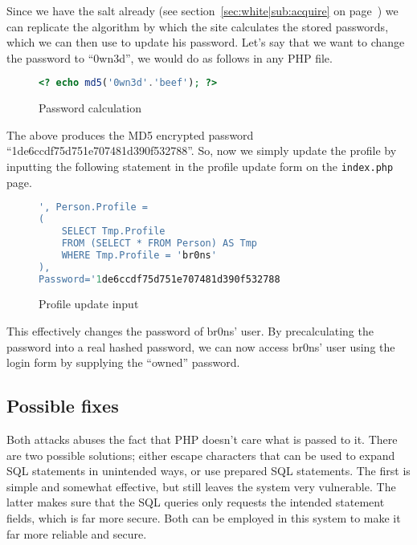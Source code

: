 \documentclass[11pt,a4paper]{article}
\newcommand{\file}[1]{{\tt #1}}
\newcommand{\secref}[1]{(see section~\ref{#1} on page~\pageref{#1})}
\begin{document}
\begin{multicols}{2}
Since we have the salt already \secref{sec:white|sub:acquire} we can replicate
the algorithm by which the site calculates the stored passwords, which we can
then use to update his password. Let's say that we want to change the password
to ``0wn3d'', we would do as follows in any PHP file.

\begin{figure}[H]
    \begin{lstlisting}[language=PHP]
<? echo md5('0wn3d'.'beef'); ?>
    \end{lstlisting}
    \caption{Password calculation}
\end{figure}

The above produces the MD5 encrypted password
``1de6ccdf75d751e707481d390f532788''. So, now we simply update the profile by
inputting the following statement in the profile update form on the
\file{index.php} page.

\begin{figure}[H]
    \begin{lstlisting}[language=SQL]
', Person.Profile =
(
    SELECT Tmp.Profile
    FROM (SELECT * FROM Person) AS Tmp
    WHERE Tmp.Profile = 'br0ns'
),
Password='1de6ccdf75d751e707481d390f532788
    \end{lstlisting}
    \caption{Profile update input}
\end{figure}

This effectively changes the password of br0ns' user. By precalculating the
password into a real hashed password, we can now access br0ns' user using the
login form by supplying the ``owned'' password.

\subsection{Possible fixes}
Both attacks abuses the fact that PHP doesn't care what is passed to it. There
are two possible solutions; either escape characters that can be used to
expand SQL statements in unintended ways, or use prepared SQL statements. The
first is simple and somewhat effective, but still leaves the system very
vulnerable. The latter makes sure that the SQL queries only requests the
intended statement fields, which is far more secure. Both can be employed in
this system to make it far more reliable and secure.

\end{multicols}
\end{document}
